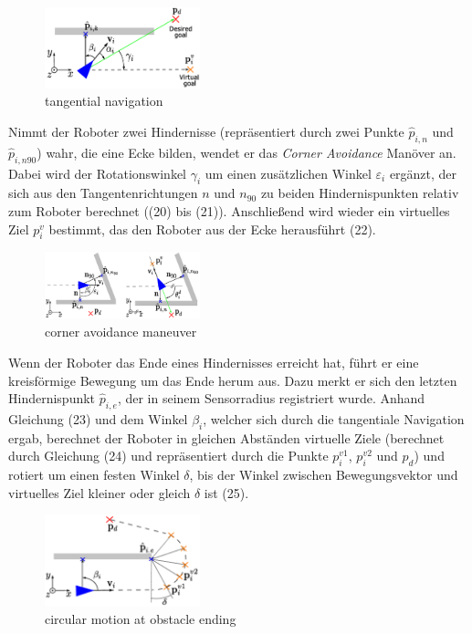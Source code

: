 \documentclass[conference]{IEEEtran}
\begin{document}
\begin{figure}[h]
    \centering
    \includegraphics[width=0.4\textwidth]{Pictures/tangetial navigation.png}
    \caption{tangential navigation}
    \label{fig:bild-unterordner}
\end{figure}

Nimmt der Roboter zwei Hindernisse (repräsentiert durch zwei Punkte \( \hat{p}_{i,n} \) und \( \hat{p}_{i,n90} \)) 
wahr, die eine Ecke bilden, wendet er das \textit{Corner Avoidance} Manöver an. 
Dabei wird der Rotationswinkel \( \gamma_i \) um einen zusätzlichen Winkel \( \varepsilon_i \) 
ergänzt, der sich aus den Tangentenrichtungen $n$ und $n_{90}$ zu beiden Hindernispunkten 
relativ zum Roboter berechnet ((20) bis (21)). Anschließend wird wieder
ein virtuelles Ziel $p_i^v$ bestimmt, das den Roboter aus der Ecke herausführt (22).

\begin{figure}[h]
    \centering
    \includegraphics[width=0.4\textwidth]{Pictures/corner avoidance maneuver.png}
    \caption{corner avoidance maneuver}
    \label{fig:bild-unterordner}
\end{figure}

Wenn der Roboter das Ende eines Hindernisses erreicht hat, führt er eine 
kreisförmige Bewegung um das Ende herum aus. Dazu merkt er sich den letzten 
Hindernispunkt \( \hat{p}_{i,e} \), der in seinem Sensorradius registriert wurde. Anhand  
Gleichung (23) und dem Winkel \( \beta_{i} \), welcher sich durch die tangentiale Navigation 
ergab, berechnet der Roboter in gleichen Abständen virtuelle Ziele (berechnet 
durch Gleichung (24) und repräsentiert durch die Punkte \( p_i^{v1} \), \( p_i^{v2} \) und \( p_d \)) und rotiert um einen 
festen Winkel \( \delta \), bis der Winkel zwischen Bewegungsvektor und virtuelles Ziel kleiner oder gleich \( \delta \) ist (25).

\begin{figure}[h]
    \centering
    \includegraphics[width=0.4\textwidth]{Pictures/circular motion at obstacle ending.png}
    \caption{circular motion at obstacle ending}
    \label{fig:bild-unterordner}
\end{figure}
\end{document}
